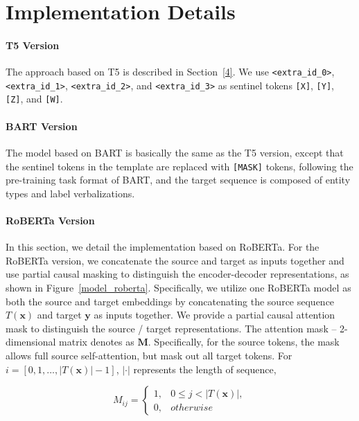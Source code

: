 \documentclass[11pt]{article}
\begin{document}
\section{Implementation Details}\label{B}
\paragraph{T5 Version}
The approach based on T5 is described in Section~\ref{4}. We use \texttt{<extra\_id\_0>}, \texttt{<extra\_id\_1>}, \texttt{<extra\_id\_2>}, and \texttt{<extra\_id\_3>} as sentinel tokens \texttt{[X]}, \texttt{[Y]}, \texttt{[Z]}, and \texttt{[W]}.
\paragraph{BART Version}
The model based on BART is basically the same as the T5 version, except that the sentinel tokens in the template are replaced with \texttt{[MASK]} tokens, following the pre-training task format of BART, and the target sequence is composed of entity types and label verbalizations.
\paragraph{RoBERTa Version}
In this section, we detail the implementation based on RoBERTa.
For the RoBERTa version, we concatenate the source and target as inputs together and use partial causal masking to distinguish the encoder-decoder representations,
as shown in Figure~\ref{model_roberta}. Specifically, we utilize one RoBERTa model as both the source and target embeddings by concatenating the source sequence $T(\boldsymbol{x})$ and target $\boldsymbol{y}$ as inputs together. We provide a partial causal attention mask to distinguish the source / target representations. The attention mask – 2-dimensional matrix denotes as $\mathbf{M}$. Specifically, for the source tokens, the mask allows full source self-attention, but mask out all target tokens. For $i =[0, 1, ..., |T(\boldsymbol{x})|-1]$, $|\cdot|$ represents the length of sequence, 

\begin{equation*}
	M_{ij}=
	\begin{cases}
		1, & 0\le j< |T(\boldsymbol{x})|,\\
		0, & otherwise
	\end{cases}
\end{equation*}
\end{document}
